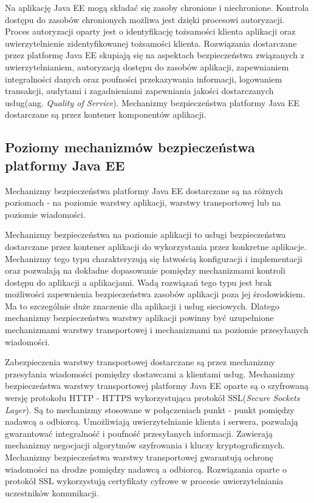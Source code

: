 	Na aplikację Java EE mogą składać się zasoby chronione i niechronione. Kontrola dostępu do zasobów chronionych możliwa jest dzięki procesowi autoryzacji. Proces autoryzacji oparty jest o identyfikację tożsamości klienta aplikacji oraz uwierzytelnienie zidentyfikowanej tożsamości klienta. Rozwiązania dostarczane przez platformę Java EE skupiają się na aspektach bezpieczeństwa związanych z uwierzytelnianiem, autoryzacją dostępu do zasobów aplikacji, zapewnianiem integralności danych oraz poufności przekazywania informacji, logowaniem transakcji, audytami i zagadnieniami zapewniania jakości dostarczanych usług(ang. \textit{Quality of Service}). Mechanizmy bezpieczeństwa platformy Java EE dostarczane są przez kontener komponentów aplikacji. 

	\subsection{Poziomy mechanizmów bezpieczeństwa platformy Java EE}

		Mechanizmy bezpieczeństwa platformy Java EE dostarczane są na różnych poziomach - na poziomie warstwy aplikacji, warstwy transportowej lub na poziomie wiadomości.

		Mechanizmy bezpieczeństwa na poziomie aplikacji to usługi bezpieczeństwa dostarczane przez kontener aplikacji do wykorzystania przez konkretne aplikacje. Mechanizmy tego typu charakteryzują się łatwością konfiguracji i implementacji oraz pozwalają na dokładne dopasowanie pomiędzy mechanizmami kontroli dostępu do aplikacji a aplikacjami. Wadą rozwiązań tego typu jest brak możliwości zapewnienia bezpieczeństwa zasobów aplikacji poza jej środowiskiem. Ma to szczególnie duże znaczenie dla aplikacji i usług sieciowych. Dlatego mechanizmy bezpieczeństwa warstwy aplikacji powinny być uzupełnione mechanizmami warstwy transportowej i mechanizmami na poziomie przesyłanych wiadomości. 

		Zabezpieczenia warstwy transportowej dostarczane są przez mechanizmy przesyłania wiadomości pomiędzy dostawcami a klientami usług. Mechanizmy bezpieczeństwa warstwy transportowej platformy Java EE oparte są o szyfrowaną wersję protokołu HTTP - HTTPS wykorzystująca protokół SSL(\textit{Secure Sockets Layer}). Są to mechanizmy stosowane w połączeniach punkt - punkt pomiędzy nadawcą a odbiorcą. Umożliwiają uwierzytelnianie klienta i serwera, pozwalają gwarantować integralność i poufność przesyłanych informacji. Zawierają mechanizmy negocjacji algorytmów szyfrowania i kluczy kryptograficznych. Mechanizmy bezpieczeństwa warstwy transportowej gwarantują ochronę wiadomości na drodze pomiędzy nadawcą a odbiorcą. Rozwiązania oparte o protokół SSL wykorzystują certyfikaty cyfrowe w procesie uwierzytelniania uczestników komunikacji. 

